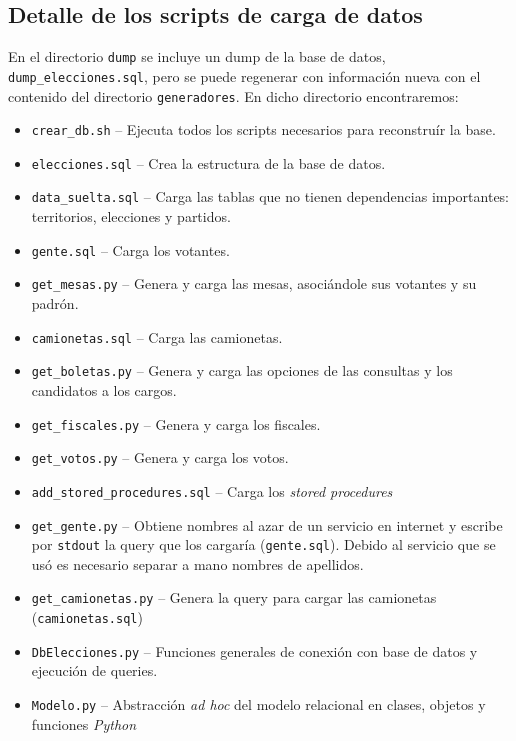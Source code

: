 \documentclass{article}
\begin{document}
\subsection{Detalle de los scripts de carga de datos}
En el directorio \texttt{dump} se incluye un dump de la base de datos, \texttt{dump\_elecciones.sql},
pero se puede regenerar con información nueva con el contenido del directorio \texttt{generadores}.
En dicho directorio encontraremos:

\begin{itemize}
	\item \texttt{crear\_db.sh} -- Ejecuta todos los scripts necesarios para reconstruír la base.
	\item \texttt{elecciones.sql} -- Crea la estructura de la base de datos.
	\item \texttt{data\_suelta.sql} -- Carga las tablas que no tienen dependencias importantes:
		territorios, elecciones y partidos.
	\item \texttt{gente.sql} -- Carga los votantes.
	\item \texttt{get\_mesas.py} -- Genera y carga las mesas, asociándole sus votantes y su padrón.
	\item \texttt{camionetas.sql} -- Carga las camionetas.
	\item \texttt{get\_boletas.py} -- Genera y carga las opciones de las consultas y los candidatos
		a los cargos.
	\item \texttt{get\_fiscales.py} -- Genera y carga los fiscales.
	\item \texttt{get\_votos.py} -- Genera y carga los votos.
	\item \texttt{add\_stored\_procedures.sql} -- Carga los \emph{stored procedures}
\end{itemize}

\begin{itemize}
	\item \texttt{get\_gente.py} -- Obtiene nombres al azar de un servicio en internet y escribe por
		\texttt{stdout} la query que los cargaría (\texttt{gente.sql}).  Debido al servicio que se
		usó es necesario separar a mano nombres de apellidos.
	\item \texttt{get\_camionetas.py} -- Genera la query para cargar las camionetas
		(\texttt{camionetas.sql})
	\item \texttt{DbElecciones.py} -- Funciones generales de conexión con base de datos y ejecución
		de queries.
	\item \texttt{Modelo.py} -- Abstracción \emph{ad hoc} del modelo relacional en clases, objetos y
		funciones \emph{Python}
\end{itemize}
\end{document}
